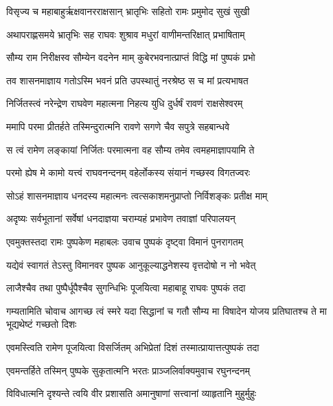 
\twolineshloka
{विसृज्य च महाबाहुर्ऋक्षवानरराक्षसान्}
{भ्रातृभिः सहितो रामः प्रमुमोद सुखं सुखी} %

\twolineshloka
{अथापराह्णसमये भ्रातृभिः सह राघवः}
{शुश्राव मधुरां वाणीमन्तरिक्षात् प्रभाषिताम्} %

\twolineshloka
{सौम्य राम निरीक्षस्व सौम्येन वदनेन माम्}
{कुबेरभवनात्प्राप्तं विद्धि मां पुष्पकं प्रभो} %

\twolineshloka
{तव शासनमाज्ञाय गतोऽस्मि भवनं प्रति}
{उपस्थातुं नरश्रेष्ठ स च मां प्रत्यभाषत} %

\twolineshloka
{निर्जितस्त्वं नरेन्द्रेण राघवेण महात्मना}
{निहत्य युधि दुर्धर्षं रावणं राक्षसेश्वरम्} %

\twolineshloka
{ममापि परमा प्रीतर्हते तस्मिन्दुरात्मनि}
{रावणे सगणे चैव सपुत्रे सहबान्धवे} %

\twolineshloka
{स त्वं रामेण लङ्कायां निर्जितः परमात्मना}
{वह सौम्य तमेव त्वमहमाज्ञापयामि ते} %

\twolineshloka
{परमो ह्येष मे कामो यत्त्वं राघवनन्दनम्}
{वहेर्लोकस्य संयानं गच्छस्व विगतज्वरः} %

\twolineshloka
{सोऽहं शासनमाज्ञाय धनदस्य महात्मनः}
{त्वत्सकाशमनुप्राप्तो निर्विशङ्कः प्रतीक्ष माम्} %

\twolineshloka
{अदृष्यः सर्वभूतानां सर्वेषां धनदाज्ञया}
{चराम्यहं प्रभावेण तवाज्ञां परिपालयन्} %

\twolineshloka
{एवमुक्तस्तदा रामः पुष्पकेण महाबलः}
{उवाच पुष्पकं दृष्ट्वा विमानं पुनरागतम्} %

\twolineshloka
{यद्येवं स्वागतं तेऽस्तु विमानवर पुष्पक}
{आनुकूल्याद्धनेशस्य वृत्तदोषो न नो भवेत्} %

\twolineshloka
{लाजैश्चैव तथा पुष्पैर्धूपैश्चैव सुगन्धिभिः}
{पूजयित्वा महाबाहू राघवः पुष्पकं तदा} %

\threelineshloka
{गम्यतामिति चोवाच आगच्छ त्वं स्मरे यदा}
{सिद्धानां च गतौ सौम्य मा विषादेन योजय}
{प्रतिघातश्च ते मा भूद्यथेष्टं गच्छतो दिशः} %

\twolineshloka
{एवमस्त्विति रामेण पूजयित्वा विसर्जितम्}
{अभिप्रेतां दिशं तस्मात्प्रायात्तत्पुष्पकं तदा} %

\twolineshloka
{एवमन्तर्हिते तस्मिन् पुष्पके सुकृतात्मनि}
{भरतः प्राञ्जलिर्वाक्यमुवाच रघुनन्दनम्} %

\twolineshloka
{विविधात्मनि दृश्यन्ते त्वयि वीर प्रशासति}
{अमानुषाणां सत्त्वानां व्याहृतानि मुहुर्मुहुः} %

